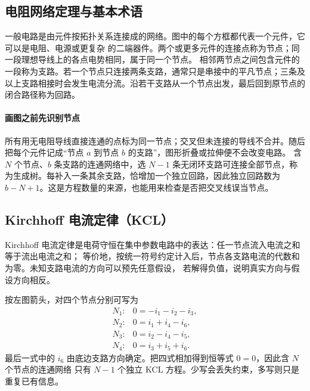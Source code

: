 \subsection*{电阻网络定理与基本术语}

一般电路是由元件按拓扑关系连接成的网络。图中的每个方框都代表一个元件，它可以是电阻、电源或更复杂
的二端器件。两个或更多元件的连接点称为节点；同一段理想导线上的各点电势相同，属于同一个节点。
相邻两节点之间包含元件的一段称为支路。若一个节点只连接两条支路，通常只是串接中的平凡节点；三条及
以上支路相接时会发生电流分流。沿若干支路从一个节点出发，最后回到原节点的闭合路径称为回路。

\networkTermsFigure
{}


\paragraph{画图之前先识别节点}
所有用无电阻导线直接连通的点标为同一节点；交叉但未连接的导线不合并。随后把每个元件记成“节点 $a$ 到节点 $b$ 的支路”，图形折叠或拉伸便不会改变电路。
含 $N$ 个节点、$b$ 条支路的连通网络中，选 $N-1$ 条无闭环支路可连接全部节点，称为生成树。每补入一条其余支路，恰增加一个独立回路，因此独立回路数为 $b-N+1$。这是方程数量的来源，也能用来检查是否把交叉线误当节点。

\subsection*{Kirchhoff 电流定律（KCL）}

Kirchhoff 电流定律是电荷守恒在集中参数电路中的表达：任一节点流入电流之和等于流出电流之和；
等价地，按统一符号约定计入后，节点各支路电流的代数和为零。未知支路电流的方向可以预先任意假设，
若解得负值，说明真实方向与假设方向相反。

\kclKvlFigure
{}

按左图箭头，对四个节点分别可写为
\[
\begin{array}{ll}
N_1:&0=-i_1-i_2-i_3,\\
N_2:&0=i_1+i_4-i_6,\\
N_3:&0=i_2-i_4-i_5,\\
N_4:&0=i_3+i_5+i_6.
\end{array}
\]
最后一式中的 $i_6$ 由底边支路方向确定。把四式相加得到恒等式 $0=0$，因此含 $N$ 个节点的连通网络
只有 $N-1$ 个独立 KCL 方程。少写会丢失约束，多写则只是重复已有信息。


